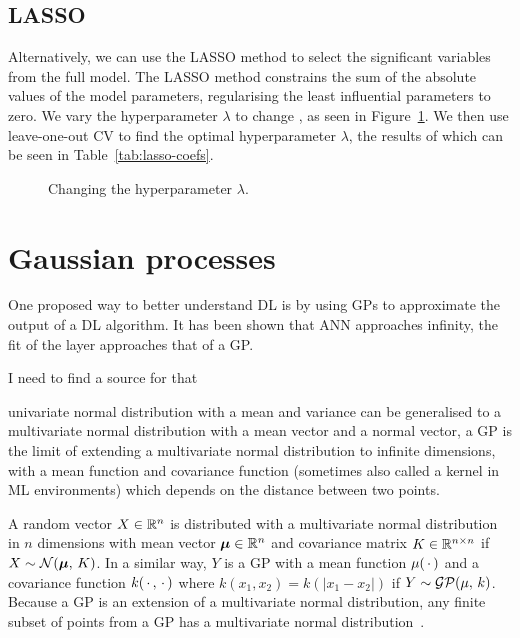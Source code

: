 \subsection{\acl{LASSO}}

Alternatively, we can use the \ac{LASSO} method to select the significant variables from the full model.
The \ac{LASSO} method constrains the sum of the absolute values of the model parameters, regularising the least influential parameters to zero.
We vary the hyperparameter \(\lambda\) to change , as seen in Figure~\ref{fig:lasso-lambda}.
We then use leave-one-out \ac{CV} to find the optimal hyperparameter \(\lambda\), the results of which can be seen in Table~\ref{tab:lasso-coefs}.

\begin{figure}[htbp]
	\centering
	
	\caption{Changing the hyperparameter \(\lambda\).}
	\label{fig:lasso-lambda}
\end{figure}


\section{Gaussian processes}

One proposed way to better understand \ac{DL} is by using \acp{GP} to approximate the output of a \ac{DL} algorithm.
It has been shown that  \ac{ANN} approaches infinity, the fit of the layer approaches that of a \ac{GP}.

\begin{todo}
I need to find a source for that
\end{todo}

 univariate normal distribution with a mean and variance can be generalised to a multivariate normal distribution with a mean vector and a normal vector, a \ac{GP} is the limit of extending a multivariate normal distribution to infinite dimensions, with a mean function and covariance function (sometimes also called a kernel in \ac{ML} environments) which depends on the distance between two points.

A random vector \(X \in \mathbb{R}{}^n\) is distributed with a multivariate normal distribution in \(n\) dimensions with mean vector \(\bm{\mu} \in \mathbb{R}{}^n\) and covariance matrix \(K \in \mathbb{R}^{n \times n}\) if \(X \sim \mathcal{N}(\bm{\mu},\, K)\).
In a similar way, \(Y\) is a \ac{GP} with a mean function \(\mu(\,\cdot\,)\) and a covariance function \(k(\,\cdot\,{}, \,\cdot\,{})\) where \(k(x_1, x_2) = k(\left|x_1-x_2\right|)\) if \(Y \sim \mathcal{GP}(\mu,\, k)\).
Because a \ac{GP} is an extension of a multivariate normal distribution, any finite subset of points from a \ac{GP} has a multivariate normal distribution~\autocite[515]{williams1996}.

